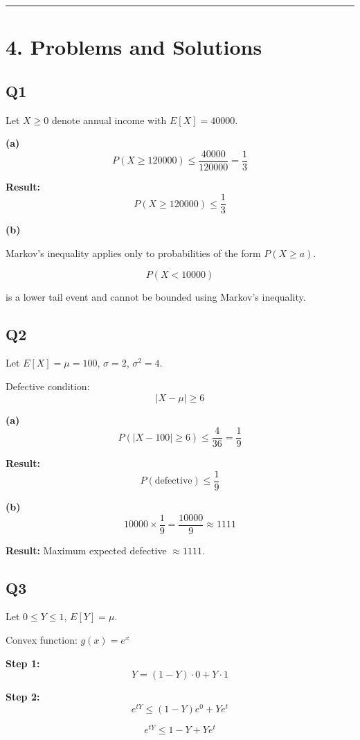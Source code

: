 \documentclass[11pt]{article}
\begin{document}
\hrule

\section*{4. Problems and Solutions}

\subsection*{Q1}

Let $X \ge 0$ denote annual income with $E[X] = 40000$.

\textbf{(a)}
\[
P(X \ge 120000) \le \frac{40000}{120000} = \frac{1}{3}
\]

\textbf{Result:}
\[
P(X \ge 120000) \le \frac{1}{3}
\]

\textbf{(b)}

Markov’s inequality applies only to probabilities of the form $P(X \ge a)$.

\[
P(X < 10000)
\]

is a lower tail event and cannot be bounded using Markov’s inequality.

\subsection*{Q2}

Let $E[X] = \mu = 100$, $\sigma = 2$, $\sigma^2 = 4$.

Defective condition:
\[
|X - \mu| \ge 6
\]

\textbf{(a)}
\[
P(|X - 100| \ge 6) \le \frac{4}{36} = \frac{1}{9}
\]

\textbf{Result:}
\[
P(\text{defective}) \le \frac{1}{9}
\]

\textbf{(b)}
\[
10000 \times \frac{1}{9} = \frac{10000}{9} \approx 1111
\]

\textbf{Result:} Maximum expected defective $\approx 1111$.

\subsection*{Q3}

Let $0 \le Y \le 1$, $E[Y] = \mu$.

Convex function: $g(x) = e^x$

\textbf{Step 1:}
\[
Y = (1-Y)\cdot 0 + Y \cdot 1
\]

\textbf{Step 2:}
\[
e^{tY} \le (1-Y)e^0 + Y e^t
\]

\[
e^{tY} \le 1 - Y + Y e^t
\]
\end{document}
